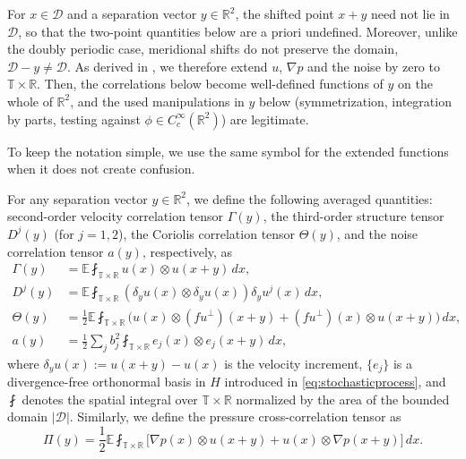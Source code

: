 \documentclass[11pt,a4paper]{article}
\numberwithin{equation}{section}
\numberwithin{theorem}{section}
\numberwithin{remark}{section}
\numberwithin{definition}{section}
\begin{document}
{For $x \in \mathcal{D}$ and a separation vector $y \in \mathbb{R}^2$, the shifted point $x+y$ need not lie in $\mathcal{D}$, so that the two-point
quantities below are a priori undefined. Moreover, unlike the doubly periodic
case, meridional shifts do not preserve the domain, $\mathcal{D} - y \neq
\mathcal{D}$. As derived in \cite{YuriAmiraliGigliola}, we therefore extend $u$, $\nabla p$ and the noise by zero to $\mathbb{T}\times\mathbb{R}$. Then,  the correlations below become well-defined
functions of $y$ on the whole of $\mathbb{R}^2$, and the used manipulations in $y$ below (symmetrization, integration by parts, testing against
$\phi \in C_c^\infty(\mathbb{R}^2)$) are legitimate.

To keep the notation simple, we use the same symbol for the extended functions
when it does not create confusion.}



For any separation vector $y \in \mathbb{R}^2$, we define the following  averaged quantities: second-order velocity correlation tensor $\Gamma(y)$, the third-order structure tensor $D^j(y)$ (for $j=1,2$), the Coriolis correlation tensor $\varTheta(y)$, and the noise correlation tensor $a(y)$, respectively, as
\begin{align}
    \Gamma(y) &= \mathbb{E} \fint_{\mathbb{T} \times \mathbb{R}} u(x) \otimes u(x+y) \, dx, \label{def:Gamma}\\
    D^j(y) &= \mathbb{E} \fint_{\mathbb{T} \times \mathbb{R}} (\delta_y u(x) \otimes \delta_y u(x)) \delta_y u^j(x) \, dx, \label{def:Dj}\\
    \varTheta(y) &= \frac{1}{2}\mathbb{E} \fint_{\mathbb{T} \times \mathbb{R}} \big( u(x) \otimes (f u^\perp)(x+y) + (f u^\perp)(x) \otimes u(x+y) \big) \, dx, \label{def:Theta}\\
    a(y) &= \frac{1}{2}\sum_{j} b_j^2 \fint_{\mathbb{T}\times \mathbb{R}} e_j(x) \otimes e_j(x+y) \, dx, \label{def:a}
\end{align}
where $\delta_y u(x) := u(x+y) - u(x)$ is the velocity increment, $\{e_j\}$ is a divergence-free orthonormal basis in $H$ introduced in \eqref{eq:stochasticprocess}, and $\fint$ denotes the spatial integral over $\mathbb{T} \times \mathbb{R}$ normalized by the area of the bounded domain $|\mathcal{D}|$. Similarly, we define the pressure cross-correlation tensor as
\begin{equation}\label{def:Pi}
    \Pi(y) = \frac{1}{2}\mathbb{E} \fint_{\mathbb{T} \times \mathbb{R}} \big[ \nabla p(x) \otimes u(x+y) + u(x) \otimes \nabla p(x+y) \big] \, dx.
\end{equation}
\end{document}
